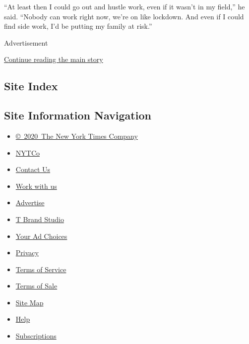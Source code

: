 ``At least then I could go out and hustle work, even if it wasn't in my
field,'' he said. ``Nobody can work right now, we're on like lockdown.
And even if I could find side work, I'd be putting my family at risk.''

Advertisement

\protect\hyperlink{after-bottom}{Continue reading the main story}

\hypertarget{site-index}{%
\subsection{Site Index}\label{site-index}}

\hypertarget{site-information-navigation}{%
\subsection{Site Information
Navigation}\label{site-information-navigation}}

\begin{itemize}
\tightlist
\item
  \href{https://help.nytimes3xbfgragh.onion/hc/en-us/articles/115014792127-Copyright-notice}{©~2020~The
  New York Times Company}
\end{itemize}

\begin{itemize}
\tightlist
\item
  \href{https://www.nytco.com/}{NYTCo}
\item
  \href{https://help.nytimes3xbfgragh.onion/hc/en-us/articles/115015385887-Contact-Us}{Contact
  Us}
\item
  \href{https://www.nytco.com/careers/}{Work with us}
\item
  \href{https://nytmediakit.com/}{Advertise}
\item
  \href{http://www.tbrandstudio.com/}{T Brand Studio}
\item
  \href{https://www.nytimes3xbfgragh.onion/privacy/cookie-policy\#how-do-i-manage-trackers}{Your
  Ad Choices}
\item
  \href{https://www.nytimes3xbfgragh.onion/privacy}{Privacy}
\item
  \href{https://help.nytimes3xbfgragh.onion/hc/en-us/articles/115014893428-Terms-of-service}{Terms
  of Service}
\item
  \href{https://help.nytimes3xbfgragh.onion/hc/en-us/articles/115014893968-Terms-of-sale}{Terms
  of Sale}
\item
  \href{https://spiderbites.nytimes3xbfgragh.onion}{Site Map}
\item
  \href{https://help.nytimes3xbfgragh.onion/hc/en-us}{Help}
\item
  \href{https://www.nytimes3xbfgragh.onion/subscription?campaignId=37WXW}{Subscriptions}
\end{itemize}
